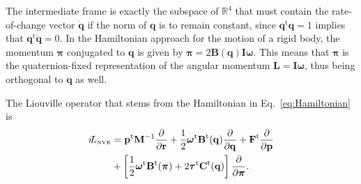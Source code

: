 \documentclass[
journal=jctcce,
layout=twocolumn
]{achemso}
\newcommand{\mt}[1]{\boldsymbol{\mathbf{#1}}}   %
\newcommand{\vt}[1]{\boldsymbol{\mathbf{#1}}}   %
\newcommand{\tr}[1]{#1^\text{t}}                %
\newcommand{\diff}[2]{\frac{\partial #1}{\partial #2}} %
\newcommand{\Liu}[1]{i\!L_\text{#1}}            %
\begin{document}
The intermediate frame is exactly the subspace of $\mathbb{R}^4$ that must contain the rate-of-change vector $\dot{\vt q}$ if the norm of $\vt q$ is to remain constant, since $\tr{\vt q} {\vt q} = 1$ implies that $\tr{\vt q} \dot{\vt q} = 0$.
In the Hamiltonian approach for the motion of a rigid body, the momentum $\vt \pi$ conjugated to $\vt q$ is given by $\vt \pi = 2 \mt B(\vt q) \mt I \vt \omega$.\cite{Silveira_2017} This means that $\vt \pi$ is the quaternion-fixed representation of the angular momentum $\vt L = \mt I \vt \omega$, thus being orthogonal to $\vt q$ as well.

The Liouville operator that stems from the Hamiltonian in Eq.~\eqref{eq:Hamiltonian} is\cite{Silveira_2017}
\begin{equation}
\label{eq:Lioville operator}
\begin{split}
\Liu{\tiny NVE} &= \tr{\vt p} {\mt M}^{-1} \diff{}{\vt r} + \frac{1}{2} \tr{\vt \omega} \tr{\mt B}(\vt q) \diff{}{\vt q} + \tr{\vt F} \diff{}{\vt p} \\
&+ \left[ \frac{1}{2} \tr{\vt \omega} \tr{\mt B}(\vt \pi) + 2 \tr{\vt \tau} \tr{\mt C}(\vt q) \right] \diff{}{\vt \pi}.
\end{split}
\end{equation}
\end{document}
